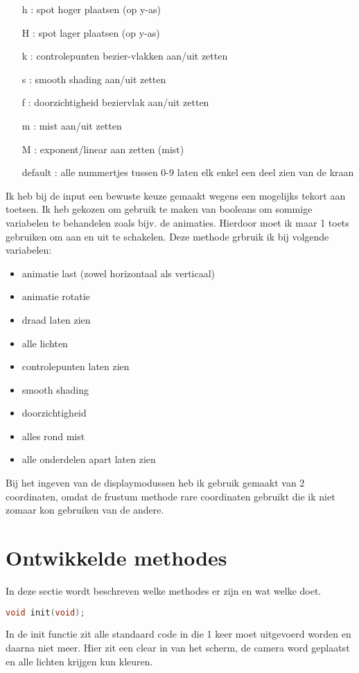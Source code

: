 \documentclass[a4paper, 12pt, one column]{article}
\begin{document}
\begin{itemize}
    \item [h]: spot hoger plaatsen (op y-as)
    \item [H]: spot lager plaatsen (op y-as)
    \item [k]: controlepunten bezier-vlakken aan/uit zetten
    \item [s]: smooth shading aan/uit zetten
    \item [f]: doorzichtigheid beziervlak aan/uit zetten
    \item [m]: mist aan/uit zetten
    \item [M]: exponent/linear aan zetten (mist)
    \item [default]: alle nummertjes tussen 0-9 laten elk enkel een deel zien van de kraan
\end{itemize}

Ik heb bij de input een bewuste keuze gemaakt wegens een mogelijks tekort aan toetsen.
Ik heb gekozen om gebruik te maken van booleans om sommige variabelen te behandelen 
zoals bijv. de animaties. Hierdoor moet ik maar 1 toets gebruiken om aan en uit te schakelen.
Deze methode grbruik ik bij volgende variabelen:

\begin{itemize}
    \item animatie last (zowel horizontaal als verticaal)
    \item animatie rotatie
    \item draad laten zien
    \item alle lichten
    \item controlepunten laten zien
    \item smooth shading
    \item doorzichtigheid
    \item alles rond mist
    \item alle onderdelen apart laten zien
\end{itemize}

Bij het ingeven van de displaymodussen heb ik gebruik gemaakt van 2 coordinaten, omdat de frustum
methode rare coordinaten gebruikt die ik niet zomaar kon gebruiken van de andere. 

\section{Ontwikkelde methodes}

In deze sectie wordt beschreven welke methodes er zijn en wat welke doet.

\begin{lstlisting}[language=C]
    void init(void);
\end{lstlisting}
In de init functie zit alle standaard code in die 1 keer moet uitgevoerd worden 
en daarna niet meer. Hier zit een clear in van het scherm, de camera word geplaatst
en alle lichten krijgen kun kleuren.
\end{document}
